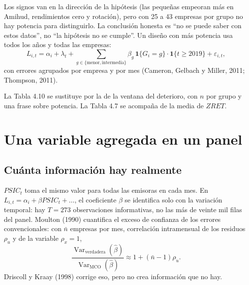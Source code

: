 \documentclass[11pt,letterpaper]{article}
\theoremstyle{definition}
\theoremstyle{plain}
\newcommand{\PSIC}{\mathit{PSIC}}
\newcommand{\ZRET}{\mathit{ZRET}}
\begin{document}
Los signos van en la dirección de la hipótesis (las pequeñas empeoran más en Amihud, rendimientos cero y rotación), pero con 25 a 43 empresas por grupo no hay potencia para distinguirlo. La conclusión honesta es ``no se puede saber con estos datos'', no ``la hipótesis no se cumple''. Un diseño con más potencia usa todos los años y todas las empresas:
\[
L_{i,t}=\alpha_i+\lambda_t+\sum_{g\in\{\text{menor},\text{intermedia}\}}\beta_g\,\mathbf 1\{G_i=g\}\cdot\mathbf 1\{t\ge 2019\}+\varepsilon_{i,t},
\]
con errores agrupados por empresa y por mes (Cameron, Gelbach y Miller, 2011; Thompson, 2011).

\begin{cambio}
La Tabla 4.10 se sustituye por la de la ventana del deterioro, con $n$ por grupo y una frase sobre potencia. La Tabla 4.7 se acompaña de la media de $\ZRET$.
\end{cambio}

\section{Una variable agregada en un panel}

\subsection{Cuánta información hay realmente}
$\PSIC_t$ toma el mismo valor para todas las emisoras en cada mes. En $L_{i,t}=\alpha_i+\beta\PSIC_t+\dots$, el coeficiente $\beta$ se identifica solo con la variación temporal: hay $T=273$ observaciones informativas, no las más de veinte mil filas del panel. Moulton (1990) cuantifica el exceso de confianza de los errores convencionales: con $\bar n$ empresas por mes, correlación intramensual de los residuos $\rho_u$ y de la variable $\rho_x=1$,
\[
\frac{\operatorname{Var}_{\mathrm{verdadera}}(\hat\beta)}{\operatorname{Var}_{\mathrm{MCO}}(\hat\beta)}\approx 1+(\bar n-1)\rho_u .
\]
Driscoll y Kraay (1998) corrige eso, pero no crea información que no hay.
\end{document}
